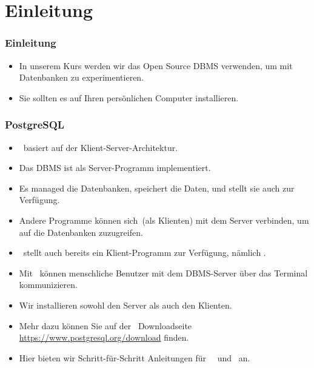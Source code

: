 \documentclass[aspectratio=169,mathserif,notheorems]{beamer}%
\subtitle{6.~Installation von PostgreSQL}%
\begin{document}
%
%
\startPresentation%
%
\section{Einleitung}%
%
\begin{frame}%
\frametitle{Einleitung}%
\begin{itemize}%
\item In unserem Kurs werden wir das Open Source DBMS \postgresql\cite{TA2024DDAMWPAM,FP2023LP,OH2017PUAR,B2024PELUYDW} verwenden, um mit Datenbanken zu experimentieren.%
\item<2-> Sie sollten es auf Ihren persönlichen Computer installieren.%
\end{itemize}%
%
\end{frame}%
%
\begin{frame}
\frametitle{PostgreSQL}%
\begin{itemize}%
\item \postgresql\ basiert auf der Klient-Server-Architektur.%
\item<2-> Das DBMS ist als Server-Programm implementiert.%
\item<3-> Es managed die Datenbanken, speichert die Daten, und stellt sie auch zur Verfügung.%
\item<4-> Andere Programme können sich~(als Klienten) mit dem Server verbinden, um auf die Datenbanken zuzugreifen.%
\item<5-> \postgresql\ stellt auch bereits ein Klient-Programm zur Verfügung, nämlich \psql.%
\item<6-> Mit \sql\ können  menschliche Benutzer mit dem DBMS-Server über das Terminal kommunizieren.%
\item<7-> Wir installieren sowohl den Server als auch den Klienten.%
\item<8-> Mehr dazu können Sie auf der \postgresql\ Downloadseite \url{https://www.postgresql.org/download} finden.%
\item<9-> Hier bieten wir Schritt-für-Schritt Anleitungen für \ubuntu\ \linux\ und \microsoftWindows\ an.%
\end{itemize}%
\end{frame}%
%
\end{document}
